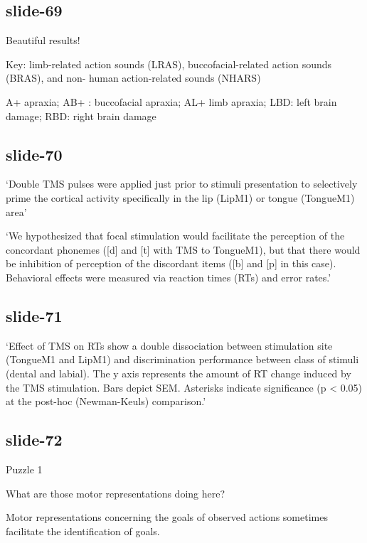 \documentclass[12pt,\papersize]{extarticle}
\begin{document}
\subsection{slide-69}
Beautiful results!

Key: limb-related action sounds (LRAS), buccofacial-related action sounds (BRAS), and non-
human action-related sounds (NHARS)

A+ apraxia; AB+ : buccofacial apraxia; AL+ limb apraxia; LBD: left brain damage; RBD: right brain damage

\subsection{slide-70}
‘Double TMS pulses were applied just prior to stimuli presentation to selectively prime the cortical activity specifically in the lip (LipM1) or tongue (TongueM1) area’
\citep[p.~381]{dausilio:2009_motor}

‘We hypothesized that focal stimulation would facilitate the perception of
the concordant phonemes ([d] and [t] with TMS to TongueM1), but that
there would be inhibition of perception of the discordant items
([b] and [p] in this case). Behavioral effects were measured via reaction
times (RTs) and error rates.’ \citep[p.~382]{dausilio:2009_motor}

\subsection{slide-71}
‘Effect of TMS on RTs show a double dissociation between stimulation
site (TongueM1 and LipM1) and discrimination performance between class
of stimuli (dental and labial). The y axis represents the amount of RT
change induced by the TMS stimulation. Bars depict SEM. Asterisks
indicate significance (p < 0.05) at the post-hoc (Newman-Keuls) comparison.’
\citep{dausilio:2009_motor}

\subsection{slide-72}
Puzzle 1



What are those motor representations doing here?




Motor representations concerning the goals of observed actions sometimes facilitate the identification of goals.
\end{document}
